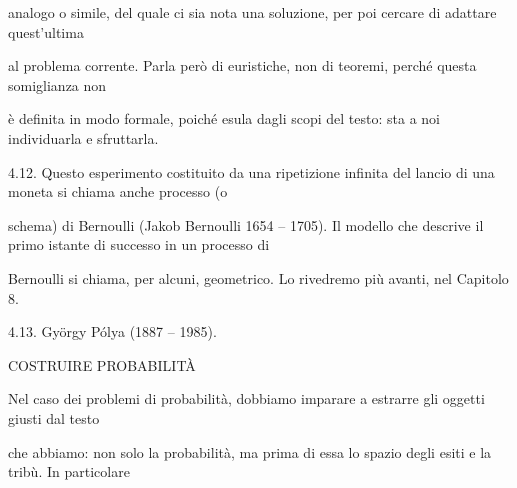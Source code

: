 \documentclass[a4paper,portrait,12pt]{article}
\begin{document}
\begin{flushleft}
analogo o simile, del quale ci sia nota una soluzione, per poi cercare di adattare quest'ultima
\end{flushleft}


\begin{flushleft}
al problema corrente. Parla per\`{o} di euristiche, non di teoremi, perch\'{e} questa somiglianza non
\end{flushleft}


\begin{flushleft}
\`{e} definita in modo formale, poich\'{e} esula dagli scopi del testo: sta a noi individuarla e sfruttarla.
\end{flushleft}


\begin{flushleft}
4.12. Questo esperimento costituito da una ripetizione infinita del lancio di una moneta si chiama anche processo (o
\end{flushleft}


\begin{flushleft}
schema) di Bernoulli (Jakob Bernoulli 1654 -- 1705). Il modello che descrive il primo istante di successo in un processo di
\end{flushleft}


\begin{flushleft}
Bernoulli si chiama, per alcuni, geometrico. Lo rivedremo più avanti, nel Capitolo 8.
\end{flushleft}


\begin{flushleft}
4.13. Gy\"{o}rgy P\'{o}lya (1887 -- 1985).
\end{flushleft}










\begin{flushleft}
COSTRUIRE PROBABILIT\`{A}
\end{flushleft}





\begin{flushleft}
Nel caso dei problemi di probabilit\`{a}, dobbiamo imparare a estrarre gli oggetti giusti dal testo
\end{flushleft}


\begin{flushleft}
che abbiamo: non solo la probabilit\`{a}, ma prima di essa lo spazio degli esiti e la tribù. In particolare
\end{flushleft}
\end{document}

